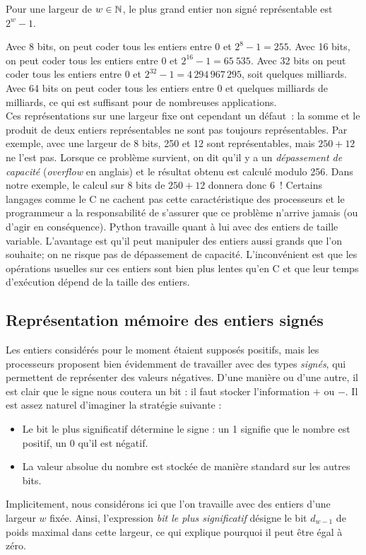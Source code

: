 \documentclass{magnoliaold}
\begin{document}
\begin{proposition}
Pour une largeur de $w\in\mathbb{N}$, le plus grand entier non signé représentable est $2^{w} - 1$.
\end{proposition}

Avec 8 bits, on peut coder tous les entiers entre 0 et $2^8-1=255$. 
Avec 16 bits, on peut coder tous les entiers entre 0 et $2^{16}-1=65\ 535$.
Avec 32 bits on peut coder
tous les entiers entre 0 et $2^{32}-1=4\,294\,967\,295$, soit quelques milliards. Avec
64 bits on peut coder tous les entiers entre 0 et quelques milliards de milliards, ce qui
est suffisant pour de nombreuses applications.\\

Ces représentations sur une largeur fixe ont cependant un défaut~: la somme et le produit de deux
entiers représentables ne sont pas toujours représentables. Par exemple, avec une largeur
de 8 bits, 250 et 12 sont représentables, mais $250+12$ ne l'est pas. Lorsque ce problème
survient, on dit qu'il y a un \emph{dépassement de capacité} (\emph{overflow} en anglais)
et le résultat obtenu est calculé modulo 256. Dans notre exemple, le calcul sur 8 bits
de $250+12$ donnera donc 6~! Certains langages comme le C ne cachent pas cette
caractéristique des processeurs et le programmeur a la responsabilité de s'assurer que
ce problème n'arrive jamais (ou d'agir en conséquence).
Python travaille quant à lui avec des entiers de taille variable. L'avantage est qu'il peut manipuler des
entiers aussi grands que l'on souhaite; on ne risque pas de dépassement de capacité.
L'inconvénient est que les opérations usuelles sur ces entiers sont bien plus lentes
qu'en C et que leur temps d'exécution dépend de la taille des
entiers.




\subsection{Représentation mémoire des entiers signés}


Les entiers considérés pour le moment étaient supposés positifs,
mais les processeurs proposent bien évidemment de travailler avec des types
\emph{signés}, qui permettent de représenter des valeurs négatives.
D'une manière ou d'une autre, il est clair que le signe nous \og coutera \fg un bit : il faut
stocker l'information $+$ ou  $-$. Il est assez naturel d'imaginer la stratégie
suivante :
\begin{itemize}
  \item Le bit le plus significatif détermine le signe : un 1 signifie que le nombre est
  positif, un 0 qu'il est négatif.
  \item La valeur absolue du nombre est stockée de manière standard sur les autres bits.
\end{itemize}
Implicitement, nous considérons ici que l'on travaille avec
des entiers d'une largeur $w$ fixée. Ainsi, l'expression \emph{bit le plus
  significatif} désigne le bit $d_{w-1}$ de poids maximal dans cette largeur, ce qui explique pourquoi il peut être égal à zéro.\\
\end{document}
